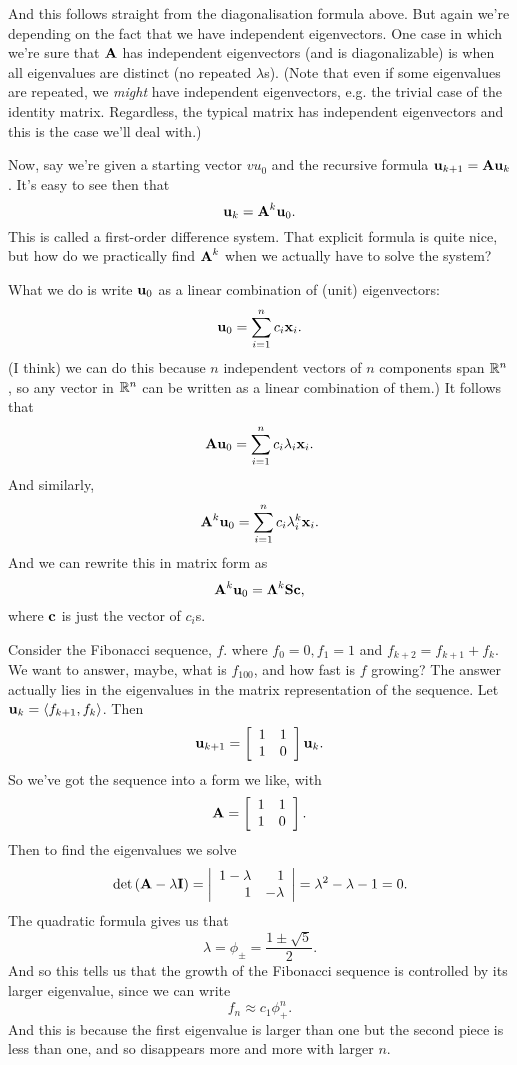 And this follows straight from the diagonalisation formula above. But again we're depending on the fact that we have independent eigenvectors. One case in which we're sure that $\boldsymbol{\mathbf{A}}$ has independent eigenvectors (and is diagonalizable) is when all eigenvalues are distinct (no repeated $\lambda$s). (Note that even if some eigenvalues are repeated, we \textit{might} have independent eigenvectors, e.g. the trivial case of the identity matrix. Regardless, the typical matrix has independent eigenvectors and this is the case we'll deal with.)

Now, say we're given a starting vector $vu_0$ and the recursive formula $\boldsymbol{\mathbf{u}}_{k+1}=\boldsymbol{\mathbf{A}}\boldsymbol{\mathbf{u}}_k$. It's easy to see then that
\[ \boldsymbol{\mathbf{u}}_k = \boldsymbol{\mathbf{A}}^k \boldsymbol{\mathbf{u}}_0. \]  
This is called a first-order difference system. That explicit formula is quite nice, but how do we practically find $\boldsymbol{\mathbf{A}}^k$ when we actually have to solve the system?

What we do is write $\boldsymbol{\mathbf{u}}_0$ as a linear combination of (unit) eigenvectors:
\[ \boldsymbol{\mathbf{u}}_0 = \sum_{i=1}^n c_i\boldsymbol{\mathbf{x}}_i. \]
(I think) we can do this because $n$ independent vectors of $n$ components span $\mathbb{R}^n$, so any vector in $\mathbb{R}^n$ can be written as a linear combination of them.) It follows that
\[ \boldsymbol{\mathbf{A}}\boldsymbol{\mathbf{u}}_0 = \sum_{i=1}^n c_i\lambda_i\boldsymbol{\mathbf{x}}_i. \]
And similarly,
\[ \boldsymbol{\mathbf{A}}^k \boldsymbol{\mathbf{u}}_0 = \sum_{i=1}^n c_i\lambda_i^k\boldsymbol{\mathbf{x}}_i. \]
And we can rewrite this in matrix form as
\[ \boldsymbol{\mathbf{A}}^k \boldsymbol{\mathbf{u}}_0 = \boldsymbol{\mathbf{\Lambda}}^k\boldsymbol{\mathbf{S}}\boldsymbol{\mathbf{c}}, \]
where $\boldsymbol{\mathbf{c}}$ is just the vector of $c_i$s. 

\bex
Consider the Fibonacci sequence, $f$. where $f_0=0, f_1=1$ and $f_{k+2} = f_{k+1}+f_k$. We want to answer, maybe, what is $f_100$, and how fast is $f$ growing? The answer actually lies in the eigenvalues in the matrix representation of the sequence. Let $\boldsymbol{\mathbf{u}}_k=\langle f_{k+1},f_k \rangle$. Then
\[ \boldsymbol{\mathbf{u}}_{k+1} = \left[ \begin{array}{rrrrrrrrrrrrrrrrrrrrrrrrr} 1&1\\1&0\\ \end{array} \right]\boldsymbol{\mathbf{u}}_k. \]
So we've got the sequence into a form we like, with 
\[ \boldsymbol{\mathbf{A}} = \left[ \begin{array}{rrrrrrrrrrrrrrrrrrrrrrrrr} 1&1\\1&0\\ \end{array} \right]. \]
Then to find the eigenvalues we solve
\[ \mathrm{det}\, (\boldsymbol{\mathbf{A}} - \lambda \boldsymbol{\mathbf{I}}) = \left| \begin{array}{rrrrrrrrrrrrrrrrrrrrrrrrr} 1-\lambda&1\\1&-\lambda\\ \end{array} \right| = \lambda^2 - \lambda - 1 = 0. \]
The quadratic formula gives us that 
\[ \lambda = \phi_\pm = \frac{1\pm\sqrt5}2. \]
And so this tells us that the growth of the Fibonacci sequence is controlled by its larger eigenvalue, since we can write
\[ f_n \approx c_1 \phi_+^n. \]
And this is because the first eigenvalue is larger than one but the second piece is less than one, and so disappears more and more with larger $n$. 

